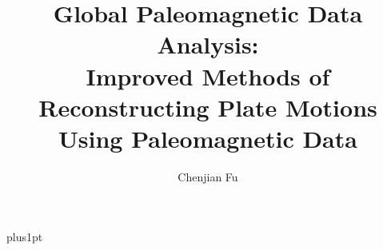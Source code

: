 \documentclass[12pt]{ociamthesis}  %
\title{Global Paleomagnetic Data Analysis:\\[1ex]     %
Improved Methods of Reconstructing Plate Motions Using Paleomagnetic Data}   %
\author{Chenjian Fu}             %
\begin{document}
\baselineskip=18pt plus1pt

\setcounter{secnumdepth}{3}
\setcounter{tocdepth}{3}


\maketitle                  %

\begin{romanpages}          %
\tableofcontents            %
\listoffigures              %
\listoftables
\end{romanpages}            %




%



\begin{appendices}
\appendix


\end{appendices}
\end{document}
